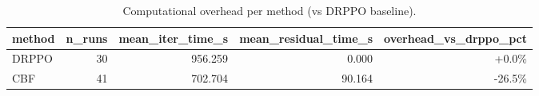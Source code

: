 \begin{table}[htbp]
\centering
\caption{Computational overhead per method (vs DRPPO baseline).}
\label{tab:overhead}
\begin{tabular}{lrrrr}
\toprule
method & n\_runs & mean\_iter\_time\_s & mean\_residual\_time\_s & overhead\_vs\_drppo\_pct \\
\midrule
DRPPO & 30 & 956.259 & 0.000 & +0.0\% \\
CBF & 41 & 702.704 & 90.164 & -26.5\% \\
\bottomrule
\end{tabular}
\end{table}
